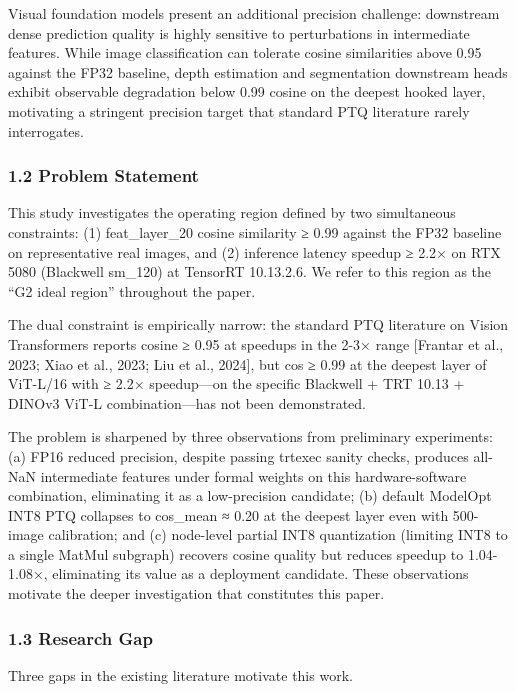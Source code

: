 \documentclass[
]{article}
\begin{document}
Visual foundation models present an additional precision challenge:
downstream dense prediction quality is highly sensitive to perturbations
in intermediate features. While image classification can tolerate cosine
similarities above 0.95 against the FP32 baseline, depth estimation and
segmentation downstream heads exhibit observable degradation below 0.99
cosine on the deepest hooked layer, motivating a stringent precision
target that standard PTQ literature rarely interrogates.

\subsubsection{1.2 Problem Statement}\label{problem-statement}

This study investigates the operating region defined by two simultaneous
constraints: (1) feat\_layer\_20 cosine similarity ≥ 0.99 against the
FP32 baseline on representative real images, and (2) inference latency
speedup ≥ 2.2× on RTX 5080 (Blackwell sm\_120) at TensorRT 10.13.2.6. We
refer to this region as the ``G2 ideal region'' throughout the paper.

The dual constraint is empirically narrow: the standard PTQ literature
on Vision Transformers reports cosine ≥ 0.95 at speedups in the 2-3×
range {[}Frantar et al., 2023; Xiao et al., 2023; Liu et al., 2024{]},
but cos ≥ 0.99 at the deepest layer of ViT-L/16 with ≥ 2.2× speedup---on
the specific Blackwell + TRT 10.13 + DINOv3 ViT-L combination---has not
been demonstrated.

The problem is sharpened by three observations from preliminary
experiments: (a) FP16 reduced precision, despite passing trtexec sanity
checks, produces all-NaN intermediate features under formal weights on
this hardware-software combination, eliminating it as a low-precision
candidate; (b) default ModelOpt INT8 PTQ collapses to cos\_mean ≈ 0.20
at the deepest layer even with 500-image calibration; and (c) node-level
partial INT8 quantization (limiting INT8 to a single MatMul subgraph)
recovers cosine quality but reduces speedup to 1.04-1.08×, eliminating
its value as a deployment candidate. These observations motivate the
deeper investigation that constitutes this paper.

\subsubsection{1.3 Research Gap}\label{research-gap}

Three gaps in the existing literature motivate this work.
\end{document}
